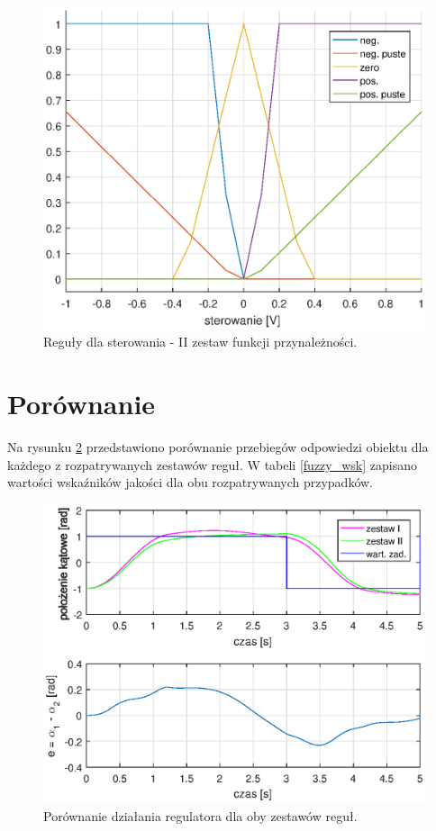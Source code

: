 \begin{figure}[h!]
	\centering
	\includegraphics[scale = 0.6]{fig/u_rules.eps}
	\caption		
	{Reguły dla sterowania -  II zestaw funkcji przynależności.}
	\label{u_rules2}
\end{figure}
\FloatBarrier

\section{Porównanie}

Na rysunku \ref{fuzzy_por} przedstawiono porównanie przebiegów odpowiedzi obiektu dla każdego z rozpatrywanych zestawów reguł. W tabeli \ref{fuzzy_wsk} zapisano wartości wska\'zników jakości dla obu rozpatrywanych przypadków.
\begin{figure}[h!]
	\centering
	\includegraphics[scale = 0.8]{fig/por_fuzzy_sets.eps}
	\caption		
	{Porównanie działania regulatora dla oby zestawów reguł.}
	\label{fuzzy_por}
\end{figure}

